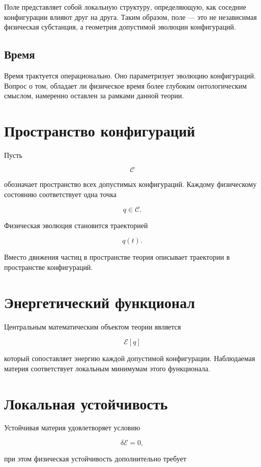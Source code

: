 Поле представляет собой локальную структуру, определяющую, как соседние конфигурации влияют друг на друга. Таким образом, поле — это не независимая физическая субстанция, а геометрия допустимой эволюции конфигураций.

\subsection{Время}

Время трактуется операционально. Оно параметризует эволюцию конфигураций. Вопрос о том, обладает ли физическое время более глубоким онтологическим смыслом, намеренно оставлен за рамками данной теории.

\section{Пространство конфигураций}

Пусть

\[ \mathcal C \]

обозначает пространство всех допустимых конфигураций. Каждому физическому состоянию соответствует одна точка

\[ q\in\mathcal C. \]

Физическая эволюция становится траекторией

\[ q(t). \]

Вместо движения частиц в пространстве теория описывает траектории в пространстве конфигураций.

\section{Энергетический функционал}

Центральным математическим объектом теории является

\[ \boxed{\mathcal E[q]} \]

который сопоставляет энергию каждой допустимой конфигурации. Наблюдаемая материя соответствует локальным минимумам этого функционала.

\section{Локальная устойчивость}

Устойчивая материя удовлетворяет условию

\[ \delta\mathcal E=0, \]

при этом физическая устойчивость дополнительно требует

